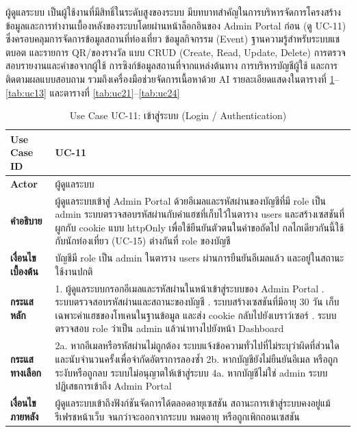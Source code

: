 ผู้ดูแลระบบ เป็นผู้ใช้งานที่มีสิทธิ์ในระดับสูงของระบบ มีบทบาทสำคัญในการบริหารจัดการโครงสร้างข้อมูลและการทำงานเบื้องหลังของระบบโดยผ่านหน้าล็อกอินของ Admin Portal ก่อน (ดู UC-11) ซึ่งครอบคลุมการจัดการข้อมูลสถานที่ท่องเที่ยว ข้อมูลกิจกรรม (Event) ฐานความรู้สำหรับระบบแชตบอต และรายการ QR/ของรางวัล แบบ CRUD (Create, Read, Update, Delete) การตรวจสอบรายงานและคำขอจากผู้ใช้ การซิงก์ข้อมูลสถานที่จากแหล่งต้นทาง การบริหารบัญชีผู้ใช้ และการติดตามผลแบบสอบถาม รวมถึงเครื่องมือช่วยจัดการเนื้อหาด้วย AI รายละเอียดแสดงในตารางที่ \ref{tab:uc11}--\ref{tab:uc13} และตารางที่ \ref{tab:uc21}--\ref{tab:uc24}

\begin{table}[H]
\centering
\caption{Use Case UC-11: เข้าสู่ระบบ (Login / Authentication)}
\label{tab:uc11}
\begin{tabular}{|p{3.2cm}|p{10cm}|}
\hline
\textbf{Use Case ID} & UC-11 \\ \hline
\textbf{Actor} & ผู้ดูแลระบบ \\ \hline
\textbf{คำอธิบาย} & ผู้ดูแลระบบเข้าสู่ Admin Portal ด้วยอีเมลและรหัสผ่านของบัญชีที่มี role เป็น admin ระบบตรวจสอบรหัสผ่านกับค่าแฮชที่เก็บไว้ในตาราง users และสร้างเซสชันที่ผูกกับ cookie แบบ httpOnly เพื่อใช้ยืนยันตัวตนในคำขอถัดไป กลไกเดียวกันนี้ใช้กับนักท่องเที่ยว (UC-15) ต่างกันที่ role ของบัญชี \\ \hline
\textbf{เงื่อนไขเบื้องต้น} & บัญชีมี role เป็น admin ในตาราง users ผ่านการยืนยันอีเมลแล้ว และอยู่ในสถานะใช้งานปกติ \\ \hline
\textbf{กระแสหลัก} & 1. ผู้ดูแลระบบกรอกอีเมลและรหัสผ่านในหน้าเข้าสู่ระบบของ Admin Portal \newline 2. ระบบตรวจสอบรหัสผ่านและสถานะของบัญชี \newline 3. ระบบสร้างเซสชันที่มีอายุ 30 วัน เก็บเฉพาะค่าแฮชของโทเคนในฐานข้อมูล และส่ง cookie กลับไปยังเบราว์เซอร์ \newline 4. ระบบตรวจสอบ role ว่าเป็น admin แล้วนำทางไปยังหน้า Dashboard \\ \hline
\textbf{กระแสทางเลือก} & 2a. หากอีเมลหรือรหัสผ่านไม่ถูกต้อง ระบบแจ้งข้อความทั่วไปที่ไม่ระบุว่าผิดที่ส่วนใด และนับจำนวนครั้งเพื่อจำกัดอัตราการลองซ้ำ \newline 2b. หากบัญชียังไม่ยืนยันอีเมล หรือถูกระงับหรือถูกลบ ระบบไม่อนุญาตให้เข้าสู่ระบบ \newline 4a. หากบัญชีไม่ใช่ admin ระบบปฏิเสธการเข้าถึง Admin Portal \\ \hline
\textbf{เงื่อนไขภายหลัง} & ผู้ดูแลระบบเข้าถึงฟังก์ชันจัดการได้ตลอดอายุเซสชัน สถานะการเข้าสู่ระบบคงอยู่แม้รีเฟรชหน้าเว็บ จนกว่าจะออกจากระบบ หมดอายุ หรือถูกเพิกถอนเซสชัน \\
\hline
\end{tabular}
\end{table}


